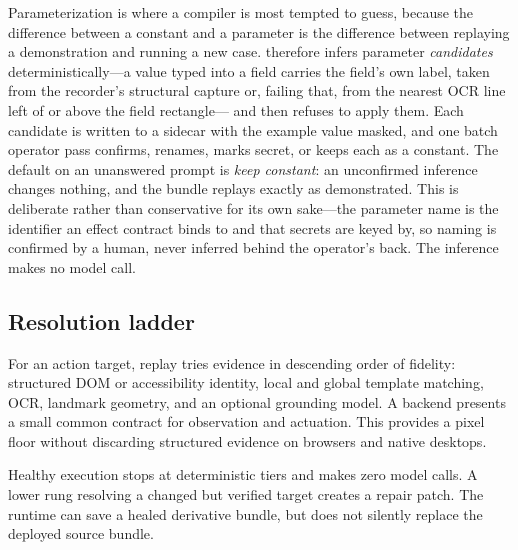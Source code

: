 Parameterization is where a compiler is most tempted to guess, because the
difference between a constant and a parameter is the difference between
replaying a demonstration and running a new case. \system{} therefore infers
parameter \emph{candidates} deterministically---a value typed into a field
carries the field's own label, taken from the recorder's structural capture or,
failing that, from the nearest OCR line left of or above the field rectangle---
and then refuses to apply them. Each candidate is written to a sidecar with the
example value masked, and one batch operator pass confirms, renames, marks
secret, or keeps each as a constant. The default on an unanswered prompt is
\emph{keep constant}: an unconfirmed inference changes nothing, and the bundle
replays exactly as demonstrated. This is deliberate rather than conservative
for its own sake---the parameter name is the identifier an effect contract binds
to and that secrets are keyed by, so naming is confirmed by a human, never
inferred behind the operator's back. The inference makes no model call.

\subsection{Resolution ladder}
For an action target, replay tries evidence in descending order of fidelity:
structured DOM or accessibility identity, local and global template matching,
OCR, landmark geometry, and an optional grounding model. A backend presents a
small common contract for observation and actuation. This provides a pixel
floor without discarding structured evidence on browsers and native desktops.

Healthy execution stops at deterministic tiers and makes zero model calls. A
lower rung resolving a changed but verified target creates a repair patch. The
runtime can save a healed derivative bundle, but does not silently replace the
deployed source bundle.

